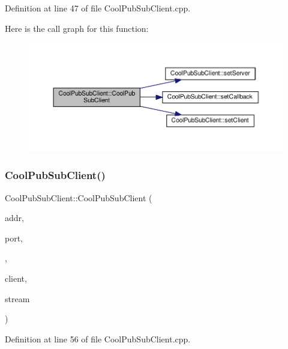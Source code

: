 Definition at line 47 of file Cool\+Pub\+Sub\+Client.\+cpp.

Here is the call graph for this function\+:
\nopagebreak
\begin{figure}[H]
\begin{center}
\leavevmode
\includegraphics[width=350pt]{class_cool_pub_sub_client_a1743a9eeef19b3b6ff1db5be8df55a9c_cgraph}
\end{center}
\end{figure}
\mbox{\label{class_cool_pub_sub_client_a0797679d710bf2b1aa802107bdb1a2fe}} 
\subsubsection{\texorpdfstring{Cool\+Pub\+Sub\+Client()}{CoolPubSubClient()}\hspace{0.1cm}{\footnotesize\ttfamily [6/14]}}
{\footnotesize\ttfamily Cool\+Pub\+Sub\+Client\+::\+Cool\+Pub\+Sub\+Client (\begin{DoxyParamCaption}\item[{I\+P\+Address}]{addr,  }\item[{uint16\+\_\+t}]{port,  }\item[{\hyperlink{class_cool_pub_sub_client_a021ec75e9fbaf658370b8005ccfddc14}{M\+Q\+T\+T\+\_\+\+C\+A\+L\+L\+B\+A\+C\+K\+\_\+\+S\+I\+G\+N\+A\+T\+U\+RE}}]{,  }\item[{Client \&}]{client,  }\item[{Stream \&}]{stream }\end{DoxyParamCaption})}



Definition at line 56 of file Cool\+Pub\+Sub\+Client.\+cpp.

